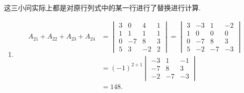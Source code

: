 \documentclass[12pt,fontset=fandol]{ctexart}
\begin{document}
\begin{solve}
这三小问实际上都是对原行列式中的某一行进行了替换进行计算.
            \begin{enumerate}
                \item \begin{align*}
                            A_{21}+A_{22}+A_{23}+A_{24}
                            & = \begin{vmatrix}
                                    3 & 0  & 4  & 1 \\
                                    1 & 1  & 1  & 1 \\
                                    0 & -7 & 8  & 3 \\
                                    5 & 3  & -2 & 2
                                \end{vmatrix}
                            = \begin{vmatrix}
                                3 & -3 & 1  & -2 \\
                                1 & 0  & 0  & 0  \\
                                0 & -7 & 8  & 3  \\
                                5 & -2 & -7 & -3
                            \end{vmatrix}             \\
                            & = (-1)^{2+1} \begin{vmatrix}
                                                -3 & 1  & -1 \\
                                                -7 & 8  & 3  \\
                                                -2 & -7 & -3
                                            \end{vmatrix} \\
                            & = 148.
                        \end{align*}


\end{enumerate}
\end{solve}
\end{document}
